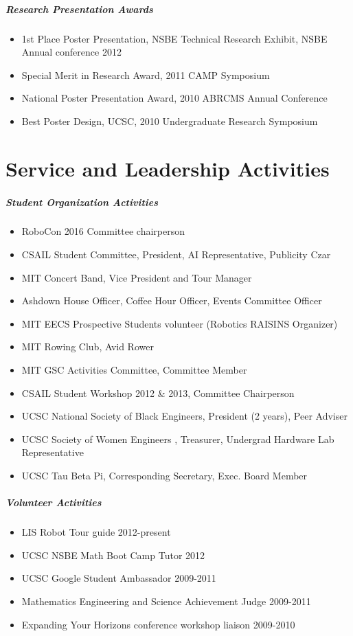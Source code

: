 \documentclass[10pt,letterpaper]{article}
\begin{document}
\subparagraph{Research Presentation Awards}
\begin{itemize}
\item 1st Place Poster Presentation, NSBE Technical Research Exhibit, NSBE Annual conference 2012
\item Special Merit in Research Award,  2011 CAMP Symposium 
\item  National Poster Presentation Award, 2010 ABRCMS Annual Conference
\item Best Poster Design, UCSC, 2010 Undergraduate Research Symposium
\end{itemize}




\section*{Service and Leadership Activities}
\subparagraph{Student Organization Activities}
\begin{itemize}
	\item RoboCon 2016 Committee chairperson 
	\item CSAIL Student Committee, President, AI Representative, Publicity Czar  
	\item MIT Concert Band,  Vice President and Tour Manager 
	\item Ashdown House Officer,  Coffee Hour Officer, Events Committee Officer 
	\item MIT EECS Prospective Students volunteer (Robotics RAISINS Organizer)
	\item MIT Rowing Club,  Avid Rower 
	\item MIT GSC Activities Committee, Committee Member 
	\item CSAIL Student Workshop 2012 \& 2013, Committee Chairperson  
	\item UCSC National Society of Black Engineers,   President (2 years), Peer Adviser 
	\item UCSC Society of Women Engineers , Treasurer, Undergrad Hardware Lab Representative 
	\item UCSC Tau Beta Pi,  Corresponding Secretary, Exec. Board Member  
\end{itemize}
\subparagraph{Volunteer Activities}
\begin{itemize}     
  \item LIS Robot Tour guide 2012-present
	\item UCSC NSBE Math Boot Camp Tutor  2012     
	\item UCSC Google Student Ambassador  2009-2011  
	\item Mathematics Engineering and Science Achievement Judge   2009-2011  
	\item Expanding Your Horizons conference workshop liaison  2009-2010
\end{itemize}
\end{document}
